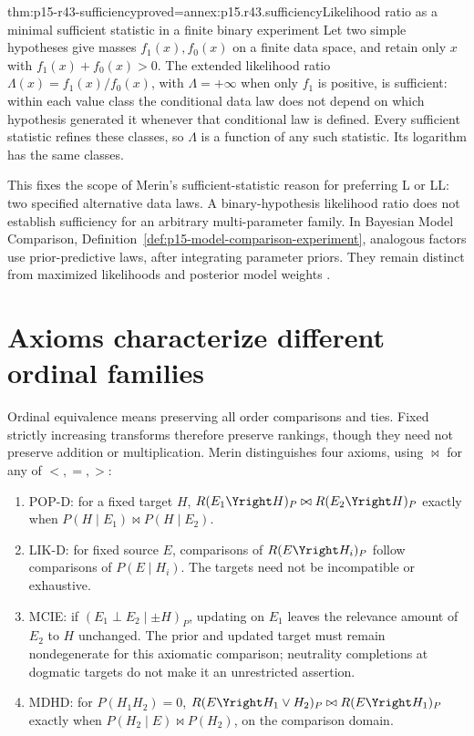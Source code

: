 \begin{hbtheorem}{thm:p15-r43-sufficiency}{proved=annex:p15.r43.sufficiency}{Likelihood ratio as a minimal sufficient statistic in a finite binary experiment}
Let two simple hypotheses give masses \(f_1(x),f_0(x)\) on a finite
data space, and retain only \(x\) with \(f_1(x)+f_0(x)>0\).
The extended likelihood ratio \(\Lambda(x)=f_1(x)/f_0(x)\), with
\(\Lambda=+\infty\) when only \(f_1\) is positive, is sufficient:
within each value class the conditional data law does not depend on
which hypothesis generated it whenever that conditional law is defined.
Every sufficient statistic refines these classes, so \(\Lambda\)
is a function of any such statistic. Its logarithm has the same classes.
\end{hbtheorem}

This fixes the scope of Merin's sufficient-statistic reason for preferring
L or LL: two specified alternative data laws. A binary-hypothesis
likelihood ratio does not establish sufficiency for an arbitrary
multi-parameter family. In Bayesian Model Comparison,
Definition~\ref{def:p15-model-comparison-experiment}, analogous factors
use prior-predictive laws, after integrating parameter priors. They
remain distinct from maximized likelihoods and posterior model weights
\parencite[p.~270 and p.~274]{Merin2021Relevance}.

\section{Axioms characterize different ordinal families}
\label{sec:p15-r43-axioms}

Ordinal equivalence means preserving all order comparisons and ties.
Fixed strictly increasing transforms therefore preserve rankings, though
they need not preserve addition or multiplication. Merin distinguishes
four axioms, using \(\bowtie\) for any of \(<,=,>\):

\begin{enumerate}
\item POP-D: for a fixed target \(H\),
\(R(E_1\Yright H)_P\bowtie R(E_2\Yright H)_P\) exactly when
\(P(H\mid E_1)\bowtie P(H\mid E_2)\).
\item LIK-D: for fixed source \(E\), comparisons of
\(R(E\Yright H_i)_P\) follow comparisons of \(P(E\mid H_i)\).
The targets need not be incompatible or exhaustive.
\item MCIE: if \((E_1\perp E_2\mid\pm H)_P\), updating on \(E_1\)
leaves the relevance amount of \(E_2\) to \(H\) unchanged.
The prior and updated target must remain nondegenerate for this
axiomatic comparison; neutrality completions at dogmatic targets do
not make it an unrestricted assertion.
\item MDHD: for \(P(H_1H_2)=0\),
\(R(E\Yright H_1\vee H_2)_P\bowtie R(E\Yright H_1)_P\) exactly
when \(P(H_2\mid E)\bowtie P(H_2)\), on the comparison domain.
\end{enumerate}

